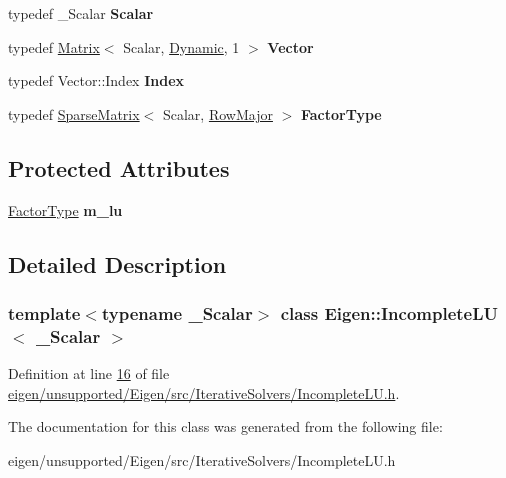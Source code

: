 \begin{DoxyCompactItemize}
typedef \+\_\+\+Scalar {\bfseries Scalar}
\item 
\mbox{\label{class_eigen_1_1_incomplete_l_u_a0e332559b3c5d785d80cebae73c1ac0a}} 
typedef \hyperlink{group___core___module_class_eigen_1_1_matrix}{Matrix}$<$ Scalar, \hyperlink{namespace_eigen_ad81fa7195215a0ce30017dfac309f0b2}{Dynamic}, 1 $>$ {\bfseries Vector}
\item 
\mbox{\label{class_eigen_1_1_incomplete_l_u_a5be4d5cde2ce2510a575865bd468cf77}} 
typedef Vector\+::\+Index {\bfseries Index}
\item 
\mbox{\label{class_eigen_1_1_incomplete_l_u_a0ffdb69e64c341b048e41a5e72e96ddd}} 
typedef \hyperlink{group___sparse_core___module_class_eigen_1_1_sparse_matrix}{Sparse\+Matrix}$<$ Scalar, \hyperlink{group__enums_ggaacded1a18ae58b0f554751f6cdf9eb13acfcde9cd8677c5f7caf6bd603666aae3}{Row\+Major} $>$ {\bfseries Factor\+Type}
\end{DoxyCompactItemize}
\subsection*{Protected Attributes}
\begin{DoxyCompactItemize}
\item 
\mbox{\label{class_eigen_1_1_incomplete_l_u_aa94187286b594310c5360ff86d82a729}} 
\hyperlink{group___sparse_core___module}{Factor\+Type} {\bfseries m\+\_\+lu}
\end{DoxyCompactItemize}


\subsection{Detailed Description}
\subsubsection*{template$<$typename \+\_\+\+Scalar$>$\newline
class Eigen\+::\+Incomplete\+L\+U$<$ \+\_\+\+Scalar $>$}



Definition at line \hyperlink{eigen_2unsupported_2_eigen_2src_2_iterative_solvers_2_incomplete_l_u_8h_source_l00016}{16} of file \hyperlink{eigen_2unsupported_2_eigen_2src_2_iterative_solvers_2_incomplete_l_u_8h_source}{eigen/unsupported/\+Eigen/src/\+Iterative\+Solvers/\+Incomplete\+L\+U.\+h}.



The documentation for this class was generated from the following file\+:\begin{DoxyCompactItemize}
\item 
eigen/unsupported/\+Eigen/src/\+Iterative\+Solvers/\+Incomplete\+L\+U.\+h\end{DoxyCompactItemize}

